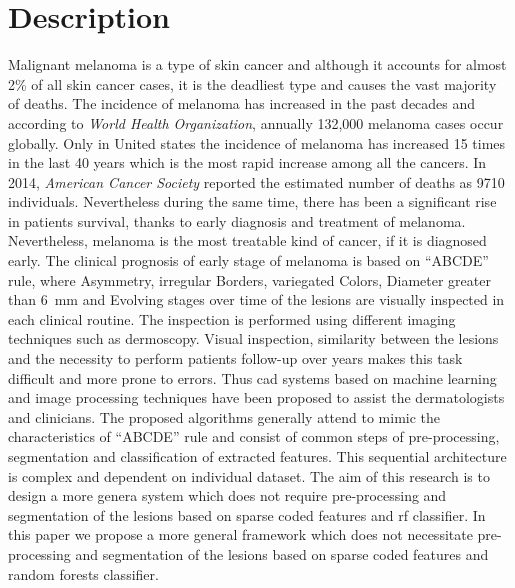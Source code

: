 \graphicspath{ {./content/intro/figures/} }

\section{Description}
\label{sec:descr}  %
Malignant melanoma is a type of skin cancer and although it accounts for almost 2\% of all skin cancer
cases, it is the deadliest type and causes the vast majority of deaths. 
{\color{red} The incidence of melanoma has increased in the past decades and according to \textit{World Health Organization}, annually 132,000 melanoma cases occur globally.}
Only in United states the incidence of melanoma has increased 15 times in the last 40 years which is the most rapid increase among all the cancers. 
In 2014, \textit{American Cancer Society} reported the estimated number of deaths as 9710 individuals.
Nevertheless during the same time, there has been a significant rise in patients survival, thanks to early diagnosis and treatment of melanoma. 
{\color{red} Nevertheless, melanoma is the most treatable kind of cancer, if it is diagnosed early.} 
The clinical prognosis of early stage of melanoma is based on ``ABCDE'' rule, where Asymmetry, irregular Borders, variegated Colors, Diameter greater than \SI{6}{\milli \meter} and Evolving stages over time of the lesions are visually inspected in each clinical routine. 
The inspection is performed using different imaging techniques such as dermoscopy. Visual inspection, similarity between the lesions and the necessity to perform patients follow-up over years makes this task difficult and more prone to errors. 
Thus \ac{cad} systems based on machine learning and image processing techniques have been proposed to assist the dermatologists and clinicians. 
The proposed algorithms generally attend to mimic the characteristics of ``ABCDE'' rule and consist of common steps of pre-processing, segmentation and classification of extracted features. 
This sequential architecture is complex and dependent on individual dataset. 
The aim of this research is to design a more genera system which does not require pre-processing and segmentation of the lesions based on sparse coded features and \ac{rf} classifier.
{\color{red} In this paper we propose a more general framework which does not necessitate pre-processing and segmentation of the lesions based on sparse coded features and random forests classifier.}



